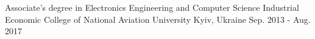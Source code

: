 

\begin{cventries}

  \cventry
    {Associate's degree in Electronics Engineering and Computer Science} %
    {Industrial Economic College of National Aviation University} %
    {Kyiv, Ukraine} %
    {Sep. 2013 - Aug. 2017} %
    {
      \begin{cvitems} %
        
      \end{cvitems}
    }

\end{cventries}
